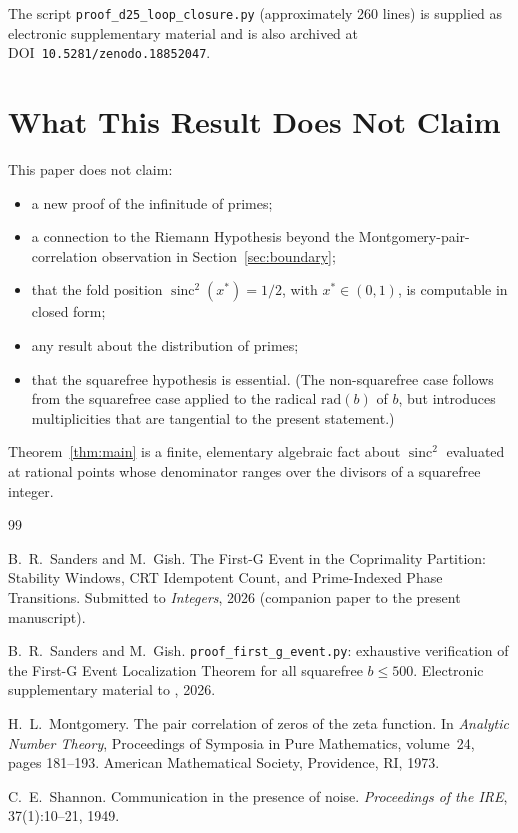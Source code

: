 \documentclass[11pt,reqno]{amsart}
\theoremstyle{plain}
\theoremstyle{remark}
\DeclareMathOperator{\sinc}{sinc}
\begin{document}
The script \texttt{proof\_d25\_loop\_closure.py} (approximately
260 lines) is supplied as electronic supplementary material and is
also archived at DOI~\texttt{10.5281/zenodo.18852047}.

\section{What This Result Does Not Claim}\label{sec:limits}

This paper does not claim:
\begin{itemize}\setlength\itemsep{1pt}
  \item a new proof of the infinitude of primes;
  \item a connection to the Riemann Hypothesis beyond the
        Montgomery-pair-correlation observation in
        Section~\ref{sec:boundary};
  \item that the fold position
        $\sinc^2(x^*) = 1/2$, with $x^* \in (0,1)$, is computable
        in closed form;
  \item any result about the distribution of primes;
  \item that the squarefree hypothesis is essential. (The
        non-squarefree case follows from the squarefree case
        applied to the radical $\mathrm{rad}(b)$ of $b$, but
        introduces multiplicities that are tangential to the
        present statement.)
\end{itemize}
Theorem~\ref{thm:main} is a finite, elementary algebraic fact
about $\sinc^2$ evaluated at rational points whose denominator
ranges over the divisors of a squarefree integer.

\begin{thebibliography}{99}

B.~R.~Sanders and M.~Gish.
\newblock The First-G Event in the Coprimality Partition:
Stability Windows, CRT Idempotent Count, and Prime-Indexed Phase
Transitions.
\newblock Submitted to \emph{Integers}, 2026 (companion paper to
the present manuscript).

B.~R.~Sanders and M.~Gish.
\newblock \texttt{proof\_first\_g\_event.py}: exhaustive
verification of the First-G Event Localization Theorem for all
squarefree $b \le 500$.
\newblock Electronic supplementary material to \cite{J04}, 2026.

H.~L.~Montgomery.
\newblock The pair correlation of zeros of the zeta function.
\newblock In \emph{Analytic Number Theory}, Proceedings of Symposia
in Pure Mathematics, volume~24, pages 181--193. American
Mathematical Society, Providence, RI, 1973.

C.~E.~Shannon.
\newblock Communication in the presence of noise.
\newblock \emph{Proceedings of the IRE}, 37(1):10--21, 1949.

\end{thebibliography}
\end{document}

